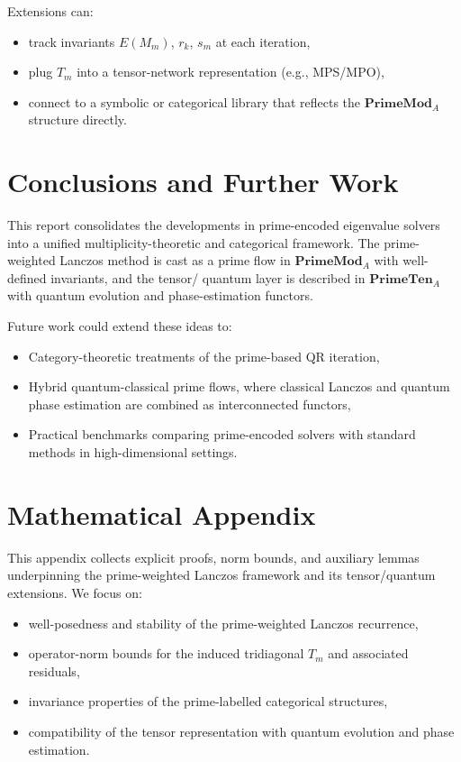 \documentclass[11pt]{article}
\begin{document}
Extensions can:
\begin{itemize}
  \item track invariants $E(M_m)$, $r_k$, $s_m$ at each iteration,
  \item plug $T_m$ into a tensor-network representation (e.g., MPS/MPO),
  \item connect to a symbolic or categorical library that reflects
    the $\mathbf{PrimeMod}_A$ structure directly.
\end{itemize}

\section{Conclusions and Further Work}

This report consolidates the developments in prime-encoded eigenvalue
solvers into a unified multiplicity-theoretic and categorical
framework. The prime-weighted Lanczos method is cast as a prime flow in
$\mathbf{PrimeMod}_A$ with well-defined invariants, and the tensor/
quantum layer is described in $\mathbf{PrimeTen}_A$ with quantum
evolution and phase-estimation functors.

Future work could extend these ideas to:
\begin{itemize}
  \item Category-theoretic treatments of the prime-based QR iteration,
  \item Hybrid quantum-classical prime flows, where classical Lanczos
    and quantum phase estimation are combined as interconnected
    functors,
  \item Practical benchmarks comparing prime-encoded solvers with
    standard methods in high-dimensional settings.
\end{itemize}

\appendix
\section*{Mathematical Appendix}

This appendix collects explicit proofs, norm bounds, and auxiliary
lemmas underpinning the prime-weighted Lanczos framework and its
tensor/quantum extensions. We focus on:
\begin{itemize}
  \item well-posedness and stability of the prime-weighted Lanczos
    recurrence,
  \item operator-norm bounds for the induced tridiagonal $T_m$ and
    associated residuals,
  \item invariance properties of the prime-labelled categorical
    structures,
  \item compatibility of the tensor representation with quantum
    evolution and phase estimation.
\end{itemize}
\end{document}
